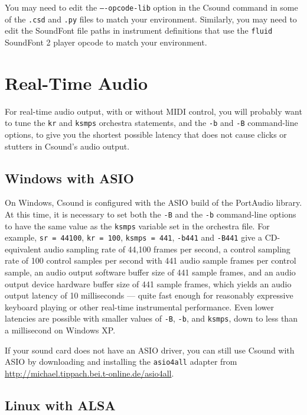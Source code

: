\documentclass[10pt,letterpaper,onecolumn]{book}
\begin{document}
You may need to edit the \texttt{----opcode-lib} option in the Csound command in some of the  \texttt{.csd} and \texttt{.py} files to match your environment. Similarly, you may need to edit the SoundFont file paths in instrument definitions that use the \texttt{fluid} SoundFont 2 player opcode to match your environment.

\section{Real-Time Audio}

For real-time audio output, with or without MIDI control, you will probably want to tune the \texttt{kr} and \texttt{ksmps} orchestra statements, and the \texttt{-b} and \texttt{-B} command-line options, to give you the shortest possible latency that does not cause clicks or stutters in Csound's audio output. 

\subsection{Windows with ASIO}

On Windows, Csound is configured with the ASIO build of the PortAudio library. At this time, it is necessary to set both the \texttt{-B} and the \texttt{-b} command-line options to have the same value as the \texttt{ksmps} variable set in the orchestra file. For example, \texttt{sr = 44100}, \texttt{kr = 100}, \texttt{ksmps = 441}, \texttt{-b441} and \texttt{-B441} give a CD-equivalent audio sampling rate of 44,100 frames per second, a control sampling rate of 100 control samples per second with 441 audio sample frames per control sample, an audio output software buffer size of 441 sample frames, and an audio output device hardware buffer size of 441 sample frames, which yields an audio output latency of 10 milliseconds --- quite fast enough for reasonably expressive keyboard playing or other real-time instrumental performance. Even lower latencies are possible with smaller values of \texttt{-B}, \texttt{-b}, and \texttt{ksmps}, down to less than a millisecond on Windows XP.

If your sound card does not have an ASIO driver, you can still use Csound with ASIO by downloading and installing the \texttt{asio4all} adapter from \url{http://michael.tippach.bei.t-online.de/asio4all}.

\subsection{Linux with ALSA}
\end{document}
